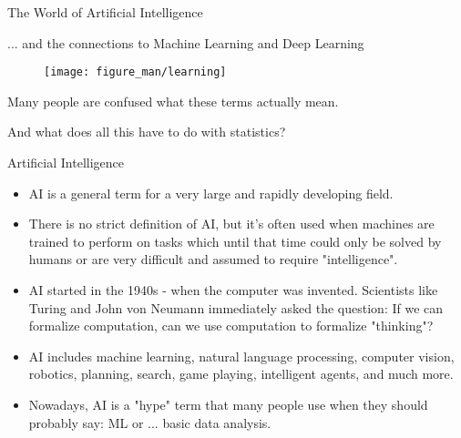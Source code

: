 \documentclass[11pt,compress,t,notes=noshow, xcolor=table]{beamer}
\begin{document}

\begin{frame}{The World of Artificial Intelligence}

... and the connections to Machine Learning and Deep Learning


\begin{center}

  \begin{figure}
    \texttt{[image: figure\_man/learning]} 
  \end{figure}

  \lz

Many people are confused what these terms actually mean. 

\lz

And what does all this have to do with statistics?


%  
  
  \end{center}
  
\end{frame}


\begin{frame}{Artificial Intelligence}

\begin{itemize}
	\item AI is a general term for a very large and rapidly developing field.
	\item There is no strict definition of AI, but it's often used when machines are trained to perform on tasks which until that time could only be solved by humans or are very difficult and assumed to require "intelligence".
    \item AI started in the 1940s - when the computer was invented. Scientists like 
        Turing and John von Neumann immediately asked the question:
        If we can formalize computation, can we use computation to formalize "thinking"?
	\item AI includes machine learning, natural language processing, computer vision, robotics, planning, search, game playing, intelligent agents, and much more.
    \item Nowadays, AI is a "hype" term that many people use when they should probably say: ML or ... basic data analysis.
\end{itemize}
  
\end{frame}
\end{document}
